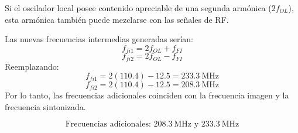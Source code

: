 \begin{enumerate}
  Si el oscilador local posee contenido apreciable de una segunda armónica ($2f_{OL}$), 
esta armónica también puede mezclarse con las señales de RF.  

    Las nuevas frecuencias intermedias generadas serían:
    \[
    f_{fi1} = 2f_{OL} + f_{FI}
    \]
    \[
    f_{fi2} = 2f_{OL} - f_{FI}
    \]
    Reemplazando:
    \[
    f_{fi1} = 2(110.4) - 12.5 = 233.3~\text{MHz}
    \]
    \[
    f_{fi2} = 2(110.4) - 12.5 = 208.3~\text{MHz}
    \]
    Por lo tanto, las frecuencias adicionales coinciden con la frecuencia imagen y la frecuencia sintonizada.
    
    \[
    \boxed{
    \text{Frecuencias adicionales: } 208.3~\text{MHz y } 233.3~\text{MHz}
    }
    \]
\end{enumerate}